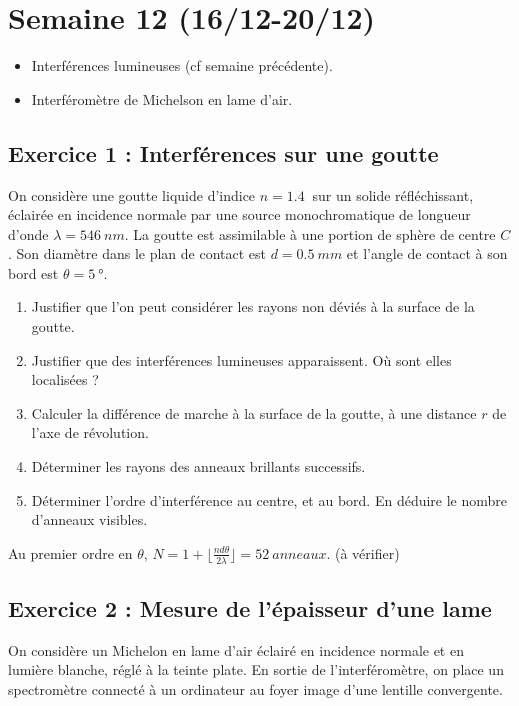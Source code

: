 \section{Semaine 12 (16/12-20/12) }


\begin{itemize}
	\item Interférences lumineuses (cf semaine précédente).
	\item Interféromètre de Michelson en lame d'air.
\end{itemize}

\subsection{Exercice 1 : Interférences sur une goutte}

On considère une goutte liquide d'indice $n=\SI{1.4}{}$ sur un solide réfléchissant, éclairée en incidence normale par une source monochromatique de longueur d'onde $\lambda = \SI{546}{nm}$. La goutte est assimilable à une portion de sphère de centre $C$. Son diamètre dans le plan de contact est $d=\SI{0.5}{mm}$ et l'angle de contact à son bord est $\theta = \SI{5}{\degree}$. 

\begin{enumerate}
	\item Justifier que l'on peut considérer les rayons non déviés à la surface de la goutte.
	\item Justifier que des interférences lumineuses apparaissent. Où sont elles localisées ?
	\item Calculer la différence de marche à la surface de la goutte, à une distance $r$ de l'axe de révolution.
	\item Déterminer les rayons des anneaux brillants successifs.
	\item Déterminer l'ordre d'interférence au centre, et au bord. En déduire le nombre d'anneaux visibles.
\end{enumerate}

 Au premier ordre en $\theta$, $N = 1 + \lfloor \frac{n d \theta}{2 \lambda}\rfloor = \SI{52}{anneaux}$. (à vérifier)

\subsection{Exercice 2 : Mesure de l'épaisseur d'une lame}

On considère un Michelon en lame d'air éclairé en incidence normale et en lumière blanche, réglé à la teinte plate. En sortie de l'interféromètre, on place un spectromètre connecté à un ordinateur au foyer image d'une lentille convergente.

